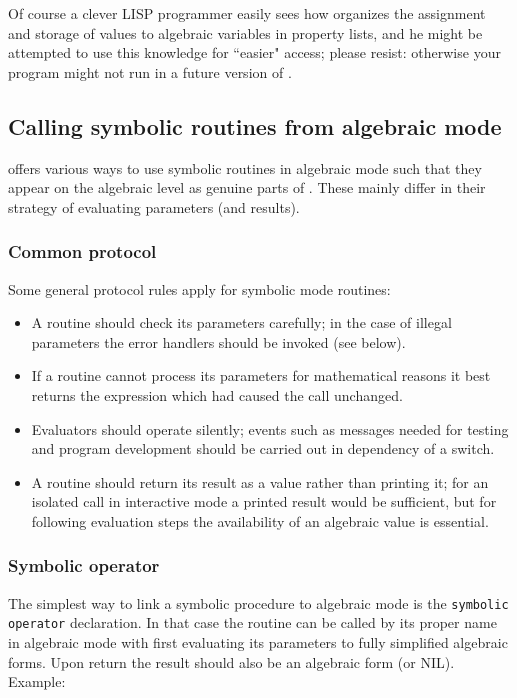 Of course a clever LISP programmer easily sees how {\reduce}
organizes the assignment and storage of values to algebraic variables
in property lists, and he might be attempted
to use this knowledge for ``easier" access; please resist:
otherwise your program might not run in a future
version of {\reduce}.


\subsection{Calling symbolic routines from algebraic mode}

{\reduce} offers various ways to use symbolic routines
in algebraic mode such that they appear on the
algebraic level as genuine parts of {\reduce}. 
These mainly differ in their strategy of evaluating parameters 
(and results).

\subsubsection{Common protocol}

Some general protocol rules apply for {\reduce} symbolic mode
routines:
\begin{itemize}
\item A routine should check its parameters carefully; in
  the case of illegal parameters the {\reduce} error handlers
  should be invoked (see below).
\item If a routine cannot process its parameters for mathematical 
  reasons it best returns the expression which had caused the call
  unchanged.
\item Evaluators should operate silently; events such as messages needed
  for testing and program development should be carried out in
  dependency of a switch.
\item A routine should return its result as a value
  rather than printing it; for an isolated call in interactive
  mode a printed result would be sufficient, but for following evaluation
  steps the availability of an algebraic value is essential.
\end{itemize}

\subsubsection{Symbolic operator}

The simplest way to link a symbolic procedure to algebraic
mode is the {\tt symbolic operator} declaration. 
In that case the routine can be called by its proper name in algebraic
mode with {\reduce} first evaluating its parameters to fully
simplified algebraic forms. Upon return the result
should also be an algebraic form (or NIL). Example:

